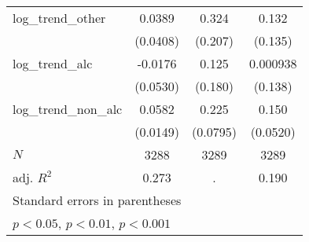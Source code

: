 {\begin{tabular}{l*{3}{c}}
\hline
log\_trend\_other&      0.0389         &       0.324         &       0.132         \\
            &    (0.0408)         &     (0.207)         &     (0.135)         \\
\hline
log\_trend\_alc&     -0.0176         &       0.125         &    0.000938         \\
            &    (0.0530)         &     (0.180)         &     (0.138)         \\
\hline
log\_trend\_non\_alc&      0.0582\sym{***}&       0.225\sym{**} &       0.150\sym{**} \\
            &    (0.0149)         &    (0.0795)         &    (0.0520)         \\
\hline
\(N\)       &        3288         &        3289         &        3289         \\
adj. \(R^{2}\)&       0.273         &           .         &       0.190         \\
\hline\hline
\multicolumn{4}{l}{\footnotesize Standard errors in parentheses}\\
\multicolumn{4}{l}{\footnotesize \sym{*} \(p<0.05\), \sym{**} \(p<0.01\), \sym{***} \(p<0.001\)}\\
\end{tabular}
}
